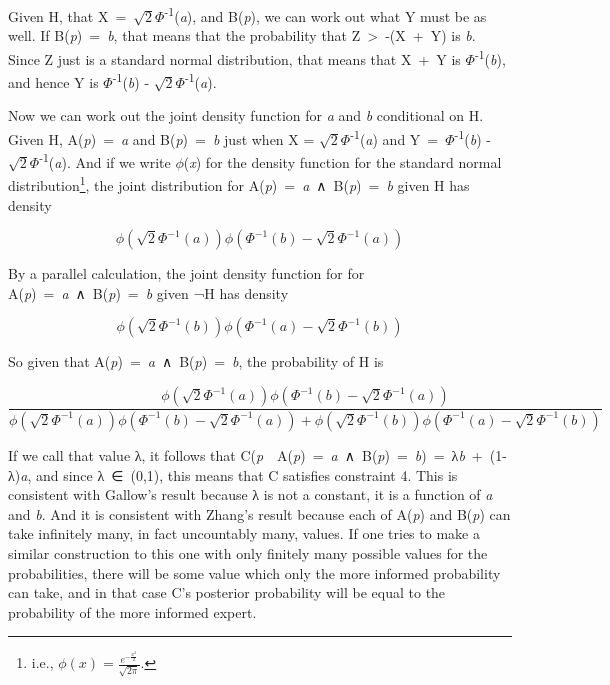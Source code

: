 \documentclass[
  12pt,
  letterpaper,
  DIV=11,
  numbers=noendperiod]{scrartcl}
\begin{document}
Given H, that X~=~\(\sqrt{2}\Phi\)\textsuperscript{-1}(\emph{a}), and
B(\emph{p}), we can work out what Y must be as well. If
B(\emph{p})~=~\emph{b}, that means that the probability that
Z~\textgreater~-(X~+~Y) is \emph{b}. Since Z just is a standard normal
distribution, that means that X~+~Y is
\(\Phi\)\textsuperscript{-1}(\emph{b}), and hence Y is
\(\Phi\)\textsuperscript{-1}(\emph{b}) -
\(\sqrt{2}\Phi\)\textsuperscript{-1}(\emph{a}).

Now we can work out the joint density function for \emph{a} and \emph{b}
conditional on H. Given H, A(\emph{p})~=~\emph{a} and
B(\emph{p})~=~\emph{b} just when X =
\(\sqrt{2}\Phi\)\textsuperscript{-1}(\emph{a}) and
Y~=~\(\Phi\)\textsuperscript{-1}(\emph{b}) -
\(\sqrt{2}\Phi\)\textsuperscript{-1}(\emph{a}). And if we write
\(\phi\)(\emph{x}) for the density function for the standard normal
distribution\footnote{i.e.,
  \(\phi(x) = \frac{e^{-\frac{x^2}{2}}}{\sqrt{2\pi}}\).}, the joint
distribution for A(\emph{p})~=~\emph{a}~∧~B(\emph{p})~=~\emph{b} given H
has density

\[
\phi(\sqrt{2}\Phi^{-1}(a)) \phi(\Phi^{-1}(b) - \sqrt{2}\Phi^{-1}(a))
\]

\noindent By a parallel calculation, the joint density function for for
A(\emph{p})~=~\emph{a}~∧~B(\emph{p})~=~\emph{b} given ¬H has density

\[
\phi(\sqrt{2}\Phi^{-1}(b)) \phi(\Phi^{-1}(a) - \sqrt{2}\Phi^{-1}(b))
\]

\noindent  So given that
A(\emph{p})~=~\emph{a}~∧~B(\emph{p})~=~\emph{b}, the probability of H is

\[
\frac{
\phi(\sqrt{2}\Phi^{-1}(a)) \phi(\Phi^{-1}(b) - \sqrt{2}\Phi^{-1}(a))
}{
\phi(\sqrt{2}\Phi^{-1}(a)) \phi(\Phi^{-1}(b) - \sqrt{2}\Phi^{-1}(a)) + \phi(\sqrt{2}\Phi^{-1}(b)) \phi(\Phi^{-1}(a) - \sqrt{2}\Phi^{-1}(b))
}
\]

\noindent If we call that value λ, it follows that
C(\emph{p}~\textbar~A(\emph{p})~=~\emph{a}~∧~B(\emph{p})~=~\emph{b})~=~λ\emph{b}~+~(1-λ)\emph{a},
and since λ~∈~(0,1), this means that C satisfies constraint 4. This is
consistent with Gallow's result because λ is not a constant, it is a
function of \emph{a} and \emph{b}. And it is consistent with Zhang's
result because each of A(\emph{p}) and B(\emph{p}) can take infinitely
many, in fact uncountably many, values. If one tries to make a similar
construction to this one with only finitely many possible values for the
probabilities, there will be some value which only the more informed
probability can take, and in that case C's posterior probability will be
equal to the probability of the more informed expert.
\end{document}
